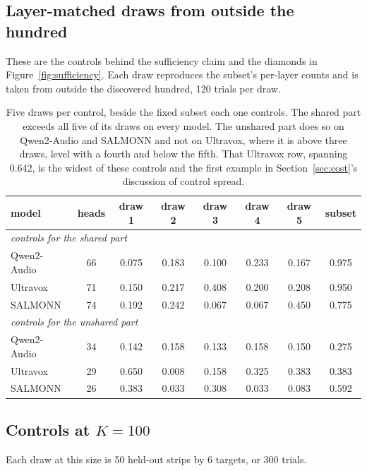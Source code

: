 \documentclass[11pt]{article}
\begin{document}
\subsection{Layer-matched draws from outside the hundred}

These are the controls behind the sufficiency claim and the diamonds in
Figure~\ref{fig:sufficiency}. Each draw reproduces the subset's per-layer counts
and is taken from outside the discovered hundred, 120 trials per draw.

\begin{table}[H]\centering\small
\begin{tabular}{lccccccc}
\toprule
model & heads & draw 1 & draw 2 & draw 3 & draw 4 & draw 5 & subset \\
\midrule
\multicolumn{8}{l}{\emph{controls for the shared part}} \\
Qwen2-Audio & 66 & 0.075 & 0.183 & 0.100 & 0.233 & 0.167 & 0.975 \\
Ultravox    & 71 & 0.150 & 0.217 & 0.408 & 0.200 & 0.208 & 0.950 \\
SALMONN     & 74 & 0.192 & 0.242 & 0.067 & 0.067 & 0.450 & 0.775 \\
\midrule
\multicolumn{8}{l}{\emph{controls for the unshared part}} \\
Qwen2-Audio & 34 & 0.142 & 0.158 & 0.133 & 0.158 & 0.150 & 0.275 \\
Ultravox    & 29 & 0.650 & 0.008 & 0.158 & 0.325 & 0.383 & 0.383 \\
SALMONN     & 26 & 0.383 & 0.033 & 0.308 & 0.033 & 0.083 & 0.592 \\
\bottomrule
\end{tabular}
\caption{Five draws per control, beside the fixed subset each one controls. The
shared part exceeds all five of its draws on every model. The unshared part does
so on Qwen2-Audio and SALMONN and not on Ultravox, where it is above three draws,
level with a fourth and below the fifth. That Ultravox row, spanning 0.642, is the
widest of these controls and the first example in Section~\ref{sec:cost}'s
discussion of control spread.}
\label{tab:app-outside}
\end{table}

\subsection{Controls at \texorpdfstring{$K{=}100$}{K=100}}

Each draw at this size is 50 held-out strips by 6 targets, or 300 trials.
\end{document}
